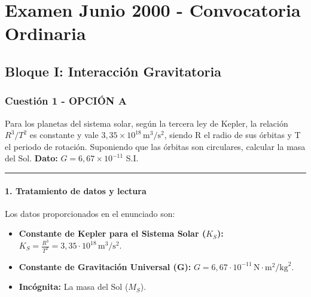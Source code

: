 \chapter{Examen Junio 2000 - Convocatoria Ordinaria}
\label{chap:2000_jun_ord}

\section{Bloque I: Interacción Gravitatoria}
\label{sec:grav_2000_jun_ord}

\subsection{Cuestión 1 - OPCIÓN A}
\label{subsec:1A_2000_jun_ord}

\begin{cajaenunciado}
Para los planetas del sistema solar, según la tercera ley de Kepler, la relación $R^{3}/T^{2}$ es constante y vale $3,35\times10^{18}\,\text{m}^{3}/\text{s}^{2}$, siendo R el radio de sus órbitas y T el periodo de rotación. Suponiendo que las órbitas son circulares, calcular la masa del Sol.
\textbf{Dato:} $G=6,67\times10^{-11}$ S.I.
\end{cajaenunciado}
\hrule

\subsubsection*{1. Tratamiento de datos y lectura}
Los datos proporcionados en el enunciado son:
\begin{itemize}
    \item \textbf{Constante de Kepler para el Sistema Solar ($K_S$):} $K_S = \frac{R^3}{T^2} = 3,35 \cdot 10^{18} \, \text{m}^3/\text{s}^2$.
    \item \textbf{Constante de Gravitación Universal (G):} $G = 6,67 \cdot 10^{-11} \, \text{N}\cdot\text{m}^2/\text{kg}^2$.
    \item \textbf{Incógnita:} La masa del Sol ($M_S$).
\end{itemize}


